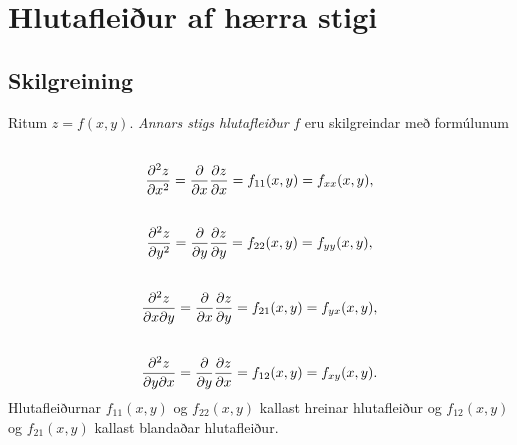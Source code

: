 \documentclass[a4paper,10pt,icelandic]{sphinxmanual}
\begin{document}
\section{Hlutafleiður af hærra stigi}
\label{Kafli2:hlutafleiur-af-haerra-stigi}

\subsection{Skilgreining}
\label{Kafli2:id14}\label{Kafli2:index-10}
Ritum \(z=f(x,y)\). \emph{Annars stigs hlutafleiður} \(f\) eru
skilgreindar með formúlunum
\begin{gather}
\begin{split}\displaystyle\end{split}\notag\\\begin{split}\frac{\partial^2 z}{\partial x^2}=
\frac{\partial}{\partial x} \frac{\partial z}{\partial x}
=f_{11}(x,y)=f_{xx}(x,y),\end{split}\notag
\end{gather}\begin{gather}
\begin{split}\displaystyle\end{split}\notag\\\begin{split}\frac{\partial^2 z}{\partial y^2}=
\frac{\partial}{\partial y} \frac{\partial z}{\partial y}
=f_{22}(x,y)=f_{yy}(x,y),\end{split}\notag
\end{gather}\begin{gather}
\begin{split}\displaystyle\end{split}\notag\\\begin{split}\frac{\partial^2 z}{\partial x\partial y}=
\frac{\partial}{\partial x} \frac{\partial z}{\partial y}
=f_{21}(x,y)=f_{yx}(x,y),\end{split}\notag
\end{gather}\begin{gather}
\begin{split}\displaystyle\end{split}\notag\\\begin{split}\frac{\partial^2 z}{\partial y\partial x}=
\frac{\partial}{\partial y} \frac{\partial z}{\partial x}
=f_{12}(x,y)=f_{xy}(x,y).\end{split}\notag
\end{gather}
Hlutafleiðurnar \(f_{11}(x,y)\) og \(f_{22}(x,y)\) kallast
hreinar hlutafleiður og \(f_{12}(x,y)\) og \(f_{21}(x,y)\)
kallast blandaðar hlutafleiður.
\end{document}
